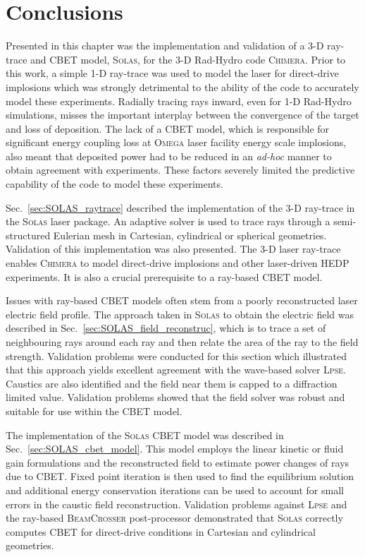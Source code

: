 \section{Conclusions}

Presented in this chapter was the implementation and validation of a 3-D ray-trace and \ac{CBET} model, \textsc{Solas}, for the 3-D \ac{Rad-Hydro} code \textsc{Chimera}.
Prior to this work, a simple 1-D ray-trace was used to model the laser for direct-drive implosions which was strongly detrimental to the ability of the code to accurately model these experiments.
Radially tracing rays inward, even for 1-D \ac{Rad-Hydro} simulations, misses the important interplay between the convergence of the target and loss of deposition.
The lack of a \ac{CBET} model, which is responsible for significant energy coupling loss at \textsc{Omega} laser facility energy scale implosions, also meant that deposited power had to be reduced in an \textit{ad-hoc} manner to obtain agreement with experiments.
These factors severely limited the predictive capability of the code to model these experiments.

Sec.~\ref{sec:SOLAS_raytrace} described the implementation of the 3-D ray-trace in the \textsc{Solas} laser package.
An adaptive solver is used to trace rays through a semi-structured Eulerian mesh in Cartesian, cylindrical or spherical geometries. 
Validation of this implementation was also presented.
The 3-D laser ray-trace enables \textsc{Chimera} to model direct-drive implosions and other laser-driven \ac{HEDP} experiments.
It is also a crucial prerequisite to a ray-based \ac{CBET} model.

Issues with ray-based \ac{CBET} models often stem from a poorly reconstructed laser electric field profile.
The approach taken in \textsc{Solas} to obtain the electric field was described in Sec.~\ref{sec:SOLAS_field_reconstruc}, which is to trace a set of neighbouring rays around each ray and then relate the area of the ray to the field strength.
Validation problems were conducted for this section which illustrated that this approach yields excellent agreement with the wave-based solver \textsc{Lpse}.
Caustics are also identified and the field near them is capped to a diffraction limited value.
Validation problems showed that the field solver was robust and suitable for use within the \ac{CBET} model.

The implementation of the \textsc{Solas} \ac{CBET} model was described in Sec.~\ref{sec:SOLAS_cbet_model}.
This model employs the linear kinetic or fluid gain formulations and the reconstructed field to estimate power changes of rays due to \ac{CBET}.
Fixed point iteration is then used to find the equilibrium solution and additional energy conservation iterations can be used to account for small errors in the caustic field reconstruction.
Validation problems against \textsc{Lpse} and the ray-based \textsc{BeamCrosser} post-processor demonstrated that \textsc{Solas} correctly computes \ac{CBET} for direct-drive conditions in Cartesian and cylindrical geometries.


